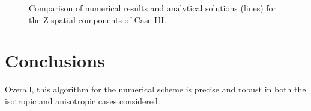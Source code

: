 \begin{figure}[H]
    \centering
    \caption{Comparison of numerical results and analytical solutions (lines) for the Z spatial components of Case III.}
    \label{Fig_NUM_SCHEME_CASE_3Z}
\end{figure}

\section{Conclusions}
Overall, this algorithm for the numerical scheme is precise and robust in both the isotropic and anisotropic cases considered.

\clearpage


